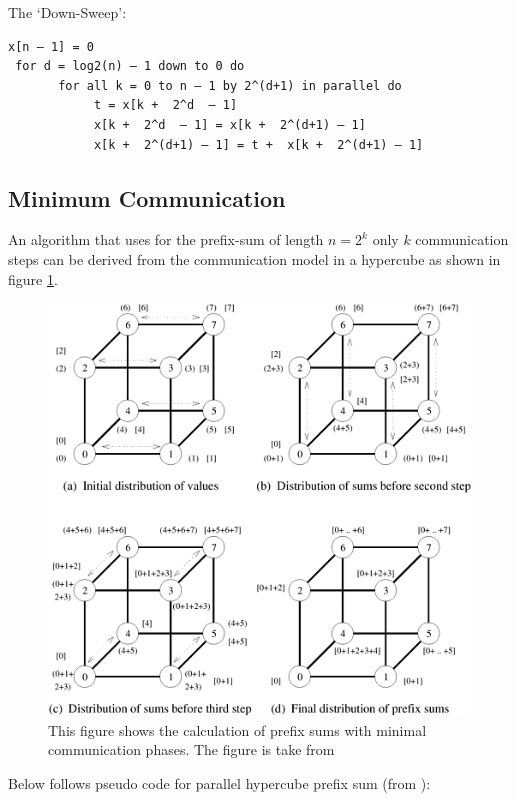 \documentclass[a4paper,11pt,twoside]{article}
\begin{document}
The `Down-Sweep':
\begin{verbatim}
x[n – 1] = 0
 for d = log2(n) – 1 down to 0 do 
       for all k = 0 to n – 1 by 2^(d+1) in parallel do 
            t = x[k +  2^d  – 1]
            x[k +  2^d  – 1] = x[k +  2^(d+1) – 1]
            x[k +  2^(d+1) – 1] = t +  x[k +  2^(d+1) – 1]

\end{verbatim}

\subsection*{Minimum Communication}
An algorithm that uses for the prefix-sum of length $n = 2^k$ only $k$ communication steps can be derived from the communication model in a hypercube as shown in figure \ref{fig:hypercube}.

\begin{figure}

  \centering
    \includegraphics[width=1\textwidth]{hypercube.png}
    \caption{This figure shows the calculation of prefix sums with minimal communication phases. The figure is take from \cite[chap 4.3]{grama2003}}
    \label{fig:hypercube}
\end{figure}

Below follows pseudo code for parallel hypercube prefix sum (from \cite{grama2003}):
\end{document}
